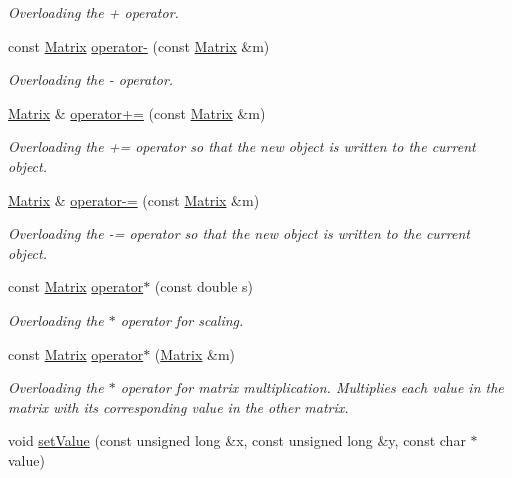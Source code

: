 \begin{DoxyCompactItemize}
\begin{DoxyCompactList}\small\item\em Overloading the + operator. \end{DoxyCompactList}\item 
const \hyperlink{class_matrix}{Matrix} \hyperlink{class_matrix_a08e75978ea8288083ef36f53b4ac115d}{operator-\/} (const \hyperlink{class_matrix}{Matrix} \&m)
\begin{DoxyCompactList}\small\item\em Overloading the -\/ operator. \end{DoxyCompactList}\item 
\hyperlink{class_matrix}{Matrix} \& \hyperlink{class_matrix_a480a72298ae1fc8443b0edfaa66d7c46}{operator+=} (const \hyperlink{class_matrix}{Matrix} \&m)
\begin{DoxyCompactList}\small\item\em Overloading the += operator so that the new object is written to the current object. \end{DoxyCompactList}\item 
\hyperlink{class_matrix}{Matrix} \& \hyperlink{class_matrix_a0e459fd035b2435ea016dc93c55ccac0}{operator-\/=} (const \hyperlink{class_matrix}{Matrix} \&m)
\begin{DoxyCompactList}\small\item\em Overloading the -\/= operator so that the new object is written to the current object. \end{DoxyCompactList}\item 
const \hyperlink{class_matrix}{Matrix} \hyperlink{class_matrix_ac4e94b307c56a15fb47a9255855f94a9}{operator$\ast$} (const double s)
\begin{DoxyCompactList}\small\item\em Overloading the $\ast$ operator for scaling. \end{DoxyCompactList}\item 
const \hyperlink{class_matrix}{Matrix} \hyperlink{class_matrix_ac396cdd2d98e1b4d99f7e17c1c26b1ec}{operator$\ast$} (\hyperlink{class_matrix}{Matrix} \&m)
\begin{DoxyCompactList}\small\item\em Overloading the $\ast$ operator for matrix multiplication. Multiplies each value in the matrix with its corresponding value in the other matrix. \end{DoxyCompactList}\item 
void \hyperlink{class_matrix_ae511e2f5874e7602fc968541efeefca1}{set\+Value} (const unsigned long \&x, const unsigned long \&y, const char $\ast$value)

\end{DoxyCompactItemize}
